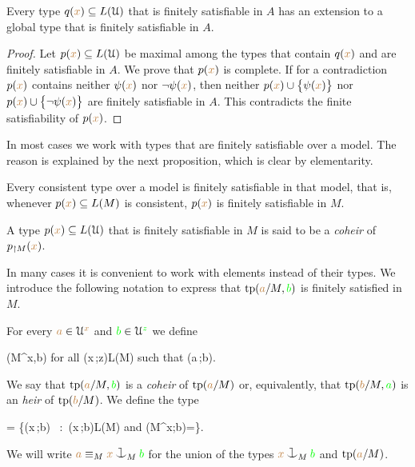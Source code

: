 \begin{proposition}\label{prop_exisntence_coheirs}
  Every type $q({\color{brown} x})\subseteq L(\EuScript U)$ that is finitely satisfiable in $A$ has an extension to a global type that is finitely satisfiable in $A$.
\end{proposition}

\begin{proof}
  Let $p({\color{brown} x})\subseteq L(\EuScript U)$ be maximal among the types that contain $q({\color{brown} x})$ and are finitely satisfiable in $A$.
  We prove that $p({\color{brown} x})$ is complete.
  If for a contradiction $p({\color{brown} x})$ contains neither $\psi({\color{brown} x})$ nor $\neg\psi({\color{brown} x})$, then  neither $p({\color{brown} x})\cup\big\{\psi({\color{brown} x})\big\}$ nor $p({\color{brown} x})\cup\big\{\neg\psi({\color{brown} x})\big\}$ are finitely satisfiable in $A$.
  This contradicts the finite satisfiability of $p({\color{brown} x})$.
\end{proof}

In most cases we work with types that are finitely satisfiable over a model.
The reason is explained by the next proposition, which is clear by elementarity.

\begin{proposition}\label{prop_coher_over_model}
  Every consistent type over a model is finitely satisfiable in that model, that is, whenever $p({\color{brown} x})\subseteq L(M)$ is consistent, $p({\color{brown} x})$ is finitely satisfiable in $M$.
\end{proposition}

\begin{definition}\label{def_choeir_uno}
  A type $p({\color{brown} x}) \subseteq L(\EuScript U)$ that is finitely satisfiable in $M$ is said to be a \emph{coheir\/} of $p_{\restriction M}({\color{brown} x})$.
\end{definition}

In many cases it is convenient to work with elements instead of their types.
We introduce the following notation to express that ${\rm tp}({\color{brown} a}/M,{\color{green} b})$ is finitely satisfied in $M$.

\begin{definition}\label{def_coheir_idepencence}
  For every ${\color{brown} a}\in\EuScript U^{\color{brown} x}$ and ${\color{green} b}\in\EuScript U^{\color{green} z}$ we define

  \noindent\llap{\textcolor{red}{\Large\warning}\kern1.5ex}
  {\IFF}
  {\phi(M^{\mr x},{\gr b})\neq\0
  \textrm{ for all }\phi({\mr x}\,;{\gr z})\in L(M) 
  \textrm{ such that }\phi({\mr a}\,;{\gr b})}.

  We say that ${\rm tp}({\color{brown} a}/M,{\color{green} b})$ is a \emph{coheir} of ${\rm tp}({\color{brown} a}/M)$ or, equivalently, that ${\rm tp}({\color{brown} b}/M,{\color{green} a})$ is an \emph{heir} of ${\rm tp}({\color{brown} b}/M)$.
  We define the type

  {=}
  {\Big\{\neg\phi({\mr x}\,;{\gr b})
  \ :\ 
  \phi({\mr x}\,;{\gr b})\in L(M)
  \textrm{ and } \phi(M^{\mr x};{\gr b})=\0\Big\}.}

  We will write \emph{${\mr a}\equiv_M{\mr x}\cnonfork_M{\gr b}$} for the union of the types ${\mr x}\cnonfork_M{\gr b}$ and ${\rm tp}({\color{brown} a}/M)$.
\end{definition}

